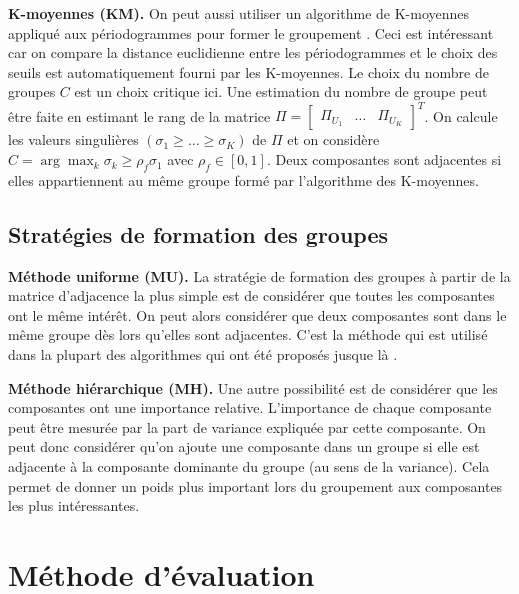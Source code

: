 \documentclass{gretsi}
\newcommand{\val}[3]{(#1_1 #3 \dots #3 #1_#2)}
\newcommand{\inter}{\left[0, 1\right]}
\begin{document}
\textbf{K-moyennes (KM).}\label{par:KM} 
    On peut aussi utiliser un algorithme de K-moyennes appliqué aux périodogrammes pour former le groupement \cite{alvarez_13_auto}.
    Ceci est intéressant car on compare la distance euclidienne entre les périodogrammes et le choix des seuils est automatiquement fourni par les K-moyennes.
    Le choix du nombre de groupes $C$ est un choix critique ici.
    Une estimation du nombre de groupe peut être faite en estimant le rang de la matrice $\Pi = \begin{bmatrix}\Pi_{U_1}&\dots&\Pi_{U_K}\end{bmatrix}^T$.
    On calcule les valeurs singulières $\val{\sigma}{K}{\ge}$ de $\Pi$ et on considère $C = \arg\max_k \sigma_k \ge \rho_f \sigma_1$ avec $\rho_f \in \inter$.
    Deux composantes sont adjacentes si elles appartiennent au même groupe formé par l'algorithme des K-moyennes.
\subsection{Stratégies de formation des groupes}
\label{sub:clust}
\textbf{Méthode uniforme (MU).}
    La stratégie de formation des groupes à partir de la matrice d'adjacence la plus simple est de considérer que toutes les composantes ont le même intérêt.
    On peut alors considérer que deux composantes sont dans le même groupe dès lors qu'elles sont adjacentes.
    C'est la méthode qui est utilisé dans la plupart des algorithmes qui ont été proposés jusque là \cite{abalov_14_auto, alvarez_13_auto}.


\textbf{Méthode hiérarchique (MH).}
    Une autre possibilité est de considérer que les composantes ont une importance relative.
    L'importance de chaque composante peut être mesurée par la part de variance expliquée par cette composante.
    On peut donc considérer qu'on ajoute une composante dans un groupe si elle est adjacente à la composante dominante du groupe (au sens de la variance).
    Cela permet de donner un poids plus important lors du groupement aux composantes les plus intéressantes.


\section{Méthode d'évaluation}
\label{sec:eval}
\end{document}
